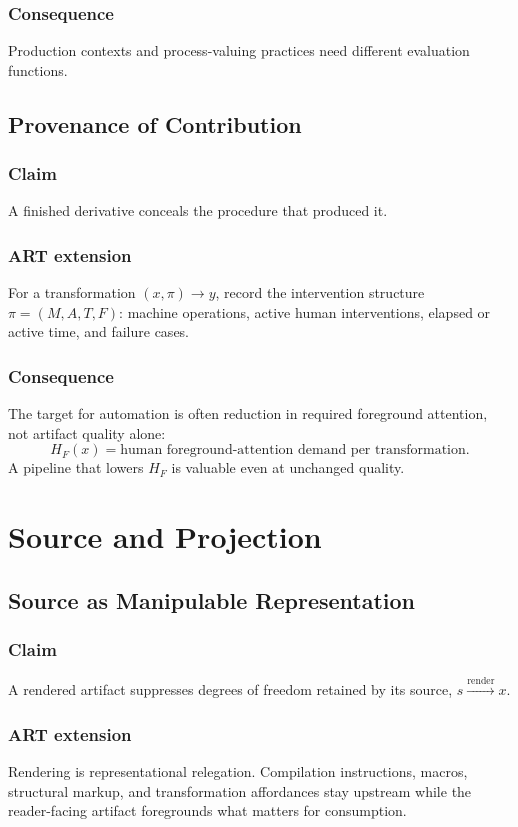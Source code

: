 \documentclass[11pt,openany]{book}
\begin{document}
\section{Consequence}
Production contexts and process-valuing practices need different
evaluation functions.

\chapter{Provenance of Contribution}
\section{Claim}
A finished derivative conceals the procedure that produced it.
\section{ART extension}
For a transformation $(x,\pi)\to y$, record the intervention structure
$\pi=(M,A,T,F)$: machine operations, active human interventions, elapsed or
active time, and failure cases.
\section{Consequence}
The target for automation is often reduction in required foreground
attention, not artifact quality alone:
\[
  H_F(x)=\text{human foreground-attention demand per transformation}.
\]
A pipeline that lowers $H_F$ is valuable even at unchanged quality.

\part{Source and Projection}

\chapter{Source as Manipulable Representation}
\section{Claim}
A rendered artifact suppresses degrees of freedom retained by its source,
$s\xrightarrow{\text{render}}x$.
\section{ART extension}
Rendering is representational relegation. Compilation instructions, macros,
structural markup, and transformation affordances stay upstream while the
reader-facing artifact foregrounds what matters for consumption.
\end{document}
